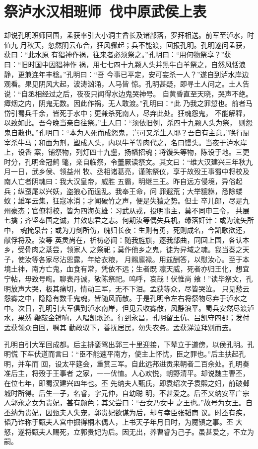 \chapter{祭泸水汉相班师~伐中原武侯上表}

却说孔明班师回国，孟获率引大小洞主酋长及诸部落，罗拜相送。前军至泸水，时值九
月秋天，忽然阴云布合，狂风骤起；兵不能渡，回报孔明。孔明遂问孟获，获曰：“此水原
有猖神作祸，往来者必须祭之。”孔明曰：“用何物祭享？”获曰：“旧时国中因猖神作
祸，用七七四十九颗人头并黑牛白羊祭之，自然风恬浪静，更兼连年丰稔。”孔明曰：“吾
今事已平定，安可妄杀一人？”遂自到泸水岸边观看。果见阴风大起，波涛汹涌，人马皆
惊。孔明甚疑，即寻土人问之。土人告说：“自丞相经过之后，夜夜只闻得水边鬼哭神号。
自黄昏直至天晓，哭声不绝。瘴烟之内，阴鬼无数。因此作祸，无人敢渡。”孔明曰：“此
乃我之罪愆也。前者马岱引蜀兵千余，皆死于水中；更兼杀死南人，尽弃此处。狂魂怨鬼，
不能解释，以致如此。吾今晚当亲自往祭。”土人曰：“须依旧例，杀四十九颗人头为祭，
则怨鬼自散也。”孔明曰：“本为人死而成怨鬼，岂可又杀生人耶？吾自有主意。”唤行厨
宰杀牛马；和面为剂，塑成人头，内以牛羊等肉代之，名曰馒头。当夜于泸水岸上，设香
案，铺祭物，列灯四十九盏，扬幡招魂；将馒头等物，陈设于地。三更时分，孔明金冠鹤
氅，亲自临祭，令董厥读祭文。其文曰：“维大汉建兴三年秋九月一日，武乡侯、领益州
牧、丞相诸葛亮，谨陈祭仪，享于故殁王事蜀中将校及南人亡者阴魂曰：我大汉皇帝，威胜
五霸，明继三王。昨自远方侵境，异俗起兵；纵虿尾以兴妖，盗狼心而逞乱。我奉王命，问
罪遐荒；大举貔貅，悉除蝼蚁；雄军云集，狂寇冰消；才闻破竹之声，便是失猿之势。但士
卒儿郎，尽是九州豪杰；官僚将校，皆为四海英雄：习武从戎，投明事主，莫不同申三令，
共展七擒；齐坚奉国之诚，并效忠君之志。何期汝等偶失兵机，缘落奸计：或为流矢所中，
魂掩泉台；或为刀剑所伤，魄归长夜：生则有勇，死则成名，今凯歌欲还，献俘将及。汝等
英灵尚在，祈祷必闻：随我旌旗，逐我部曲，同回上国，各认本乡，受骨肉之蒸尝，领家人
之祭祀；莫作他乡之鬼，徒为异域之魂。我当奏之天子，使汝等各家尽沾恩露，年给衣粮，
月赐廪禄。用兹酬答，以慰汝心。至于本境土神，南方亡鬼，血食有常，凭依不远；生者既
凛天威，死者亦归王化，想宜宁帖，毋致号啕。聊表丹诚，敬陈祭祀。呜呼，哀哉！伏惟尚
飨！”读毕祭文，孔明放声大哭，极其痛切，情动三军，无不下泪。孟获等众，尽皆哭泣。
只见愁云怨雾之中，隐隐有数千鬼魂，皆随风而散。于是孔明令左右将祭物尽弃于泸水之
中。次日，孔明引大军俱到泸水南岸，但见云收雾散，风静浪平。蜀兵安然尽渡泸水，果然
鞭敲金镫响，人唱凯歌还。行到永昌，孔明留王伉、吕凯守四郡；发付孟获领众自回，嘱其
勤政驭下，善抚居民，勿失农务。孟获涕泣拜别而去。

孔明自引大军回成都。后主排銮驾出郭三十里迎接，下辇立于道傍，以侯孔明。孔明慌
下车伏道而言曰：“臣不能速平南方，使主上怀忧，臣之罪也。”后主扶起孔明，并车而
回，设太平筵会，重赏三军。自此远邦进贡来朝者二百余处。孔明奏准后主，将殁于王事者
之家，一一优恤。人心欢悦，朝野清平。却说魏主曹丕，在位七年，即蜀汉建兴四年也。丕
先纳夫人甄氏，即袁绍次子袁熙之妇，前破邺城时所得。后生一子，名睿，字元仲，自幼聪
明，不甚爱之。后丕又纳安平广宗人郭永之女为贵妃，甚有颜色；其父尝曰：“吾女乃女中
之王也。”故号为女王。自丕纳为贵妃，因甄夫人失宠，郭贵妃欲谋为后，却与幸臣张韬商
议。时丕有疾，韬乃诈称于甄夫人宫中掘得桐木偶人，上书天子年月日时，为魇镇之事。丕
大怒，遂将甄夫人赐死，立郭贵妃为后。因无出，养曹睿为己子。虽甚爱之，不立为嗣。


